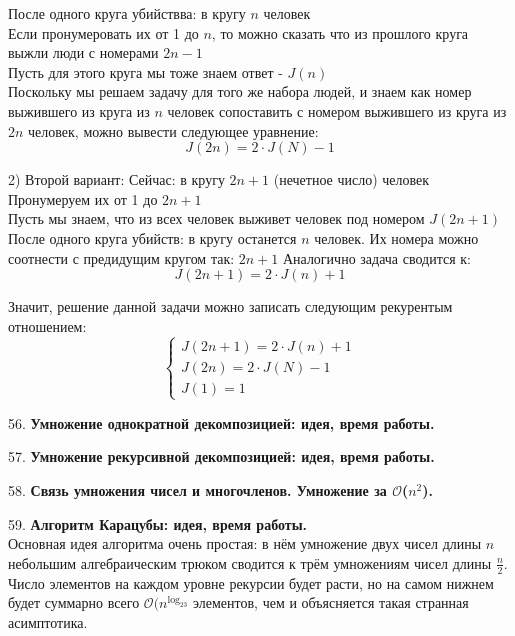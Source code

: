 \documentclass[12pt]{article}
\begin{document}
После одного круга убийствва: в кругу $n$ человек \\
Если пронумеровать их от 1 до $n$, то можно сказать что из прошлого круга выжли люди с номерами $2n - 1$\\
Пусть для этого круга мы тоже знаем ответ - $J(n)$ \\
Поскольку мы решаем задачу для того же набора людей, и знаем как номер выжившего из круга из $n$ человек сопоставить с номером выжившего 
из круга из $2n$ человек, можно вывести следующее уравнение:
$$J(2n)=2\cdot J(N) - 1$$

2) Второй вариант:
Сейчас: в кругу $2n+1$ (нечетное число) человек \\
Пронумеруем их от 1 до $2n+1$ \\
Пусть мы знаем, что из всех человек выживет человек под номером $J(2n+1)$ \\

После одного круга убийств: в кругу останется $n$ человек.
Их номера можно соотнести с предидущим кругом так: $2n+1$
Аналогично задача сводится к:
$$J(2n+1) = 2\cdot J(n) + 1$$

Значит, решение данной задачи можно записать следующим рекурентым отношением:\\
\[
\begin{cases}
J(2n+1) = 2\cdot J(n) + 1
\\
J(2n)=2\cdot J(N) - 1
\\
J(1) = 1
\end{cases}
\]

56. \textbf{Умножение однократной декомпозицией: идея, время работы.}

57. \textbf{Умножение рекурсивной декомпозицией: идея, время работы.}

58. \textbf{Связь умножения чисел и многочленов. Умножение за $\mathcal{O}$($n^2$).}

59. \textbf{Алгоритм Карацубы: идея, время работы.}\\

Основная идея алгоритма очень простая: в нём умножение двух чисел длины $n$ небольшим алгебраическим трюком сводится к трём умножениям чисел длины $\frac{n}{2}$. Число элементов на каждом уровне рекурсии будет расти, но на самом нижнем будет суммарно всего $\mathcal{O}(n^{\log_23}$ элементов, чем и объясняется такая странная асимптотика.
\end{document}
